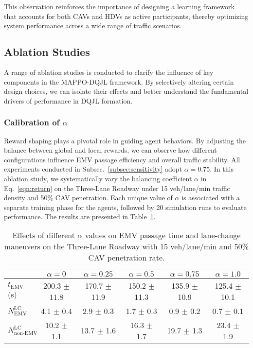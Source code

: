This observation reinforces the importance of designing a learning framework that accounts for both CAVs and HDVs as active participants, thereby optimizing system performance across a wide range of traffic scenarios.
\FloatBarrier
\subsection{Ablation Studies}
\label{subsec:ablations}
A range of ablation studies is conducted to clarify the influence of key components in the MAPPO-DQJL framework. By selectively altering certain design choices, we can isolate their effects and better understand the fundamental drivers of performance in DQJL formation.

\subsubsection{Calibration of \texorpdfstring{$\alpha$}{alpha}}\label{subsec:reward}
Reward shaping plays a pivotal role in guiding agent behaviors. By adjusting the balance between global and local rewards, we can observe how different configurations influence EMV passage efficiency and overall traffic stability. All experiments conducted in Subsec.~\ref{subsec:sensitivity} adopt $\alpha = 0.75$. In this ablation study, we systematically vary the balancing coefficient \(\alpha\) in Eq.~\eqref{eqn:return} on the Three-Lane Roadway under 15 veh/lane/min traffic density and 50\% CAV penetration. Each unique value of \(\alpha\) is associated with a separate training phase for the agents, followed by 20 simulation runs to evaluate performance. The results are presented in Table~\ref{tab:alpha_ablations}.
\begin{table}[htbp]
\centering
\begin{tabular}{lccccc}
\toprule
 & \(\alpha = 0\) & \(\alpha = 0.25\) & \(\alpha = 0.5\) & \(\alpha = 0.75\) & \(\alpha = 1.0\) \\
\midrule
$t_{\text{EMV}}$ (s) & 200.3 $\pm$ 11.8 & 170.7 $\pm$ 11.9 & 150.2 $\pm$ 11.3 & 135.9 $\pm$ 10.9 & 125.4 $\pm$ 10.1 \\[6pt]
$N_{\text{EMV}}^{\text{LC}}$ & 4.1 $\pm$ 0.4 & 2.9 $\pm$ 0.3 & 1.7 $\pm$ 0.3 & 0.9 $\pm$ 0.2 & 0.7 $\pm$ 0.1 \\[6pt]
$N_{\text{non-EMV}}^{\text{LC}}$ & 10.2 $\pm$ 1.1 & 13.7 $\pm$ 1.6 & 16.3 $\pm$ 1.7 & 19.7 $\pm$ 1.3 & 23.4 $\pm$ 1.9 \\
\bottomrule
\end{tabular}
\caption{Effects of different \(\alpha\) values on EMV passage time and lane-change maneuvers on the Three-Lane Roadway with 15 veh/lane/min and 50\% CAV penetration rate.}
\label{tab:alpha_ablations}
\end{table}

